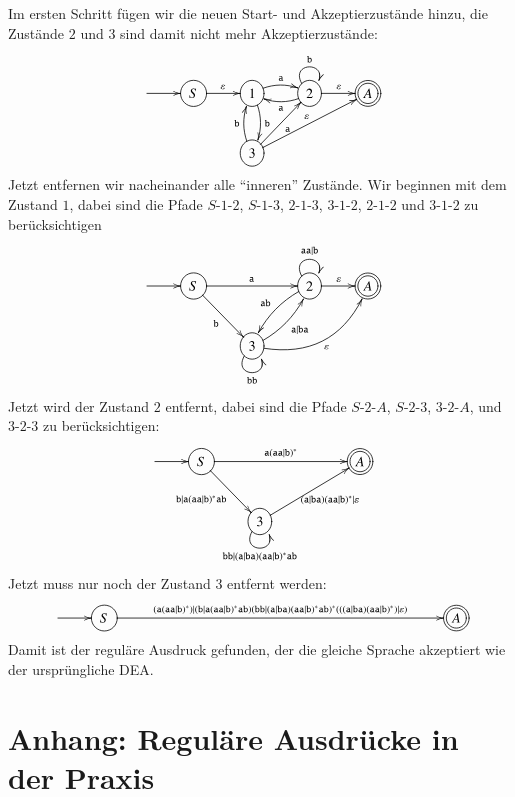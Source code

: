 Im ersten Schritt fügen wir die neuen Start- und Akzeptierzustände 
hinzu, die Zustände $2$ und $3$ sind damit nicht mehr Akzeptierzustände:
\[
\entrymodifiers={++[o][F]}
\xymatrix{
*+\txt{}\ar[r]
	&S\ar[r]^{\varepsilon}
		&{1}\ar@/^/[r]^{\tt a} \ar@/^/[d]^{\tt b}
			&{2} \ar@(ul,ur)^{\tt b} \ar@/^/[l]^{\tt a}\ar[r]^{\varepsilon}
				&*++[o][F=]{A}
\\
*+\txt{}
	&*+\txt{}
		&{3} \ar[ur]_{\tt a} \ar@/^/[u]^{\tt b} \ar[urr]^{\varepsilon}
}
\]
Jetzt entfernen wir nacheinander alle ``inneren'' Zustände.
Wir beginnen mit dem Zustand $1$, dabei sind die Pfade
$S$-$1$-$2$,
$S$-$1$-$3$,
$2$-$1$-$3$,
$3$-$1$-$2$,
$2$-$1$-$2$
und $3$-$1$-$2$
zu berücksichtigen
\[
\entrymodifiers={++[o][F]}
\xymatrix{
*+\txt{}\ar[r]
	&S\ar[rr]^{\tt a} \ar[dr]_{\tt b}
		&*+\txt{}
			&{2} \ar@(ul,ur)^{\tt aa|b} \ar@/_/[dl]_{\tt ab} \ar[r]^{\varepsilon}
				&*++[o][F=]{A}
\\
*+\txt{}
	&*+\txt{}
		&{3} \ar@/_/[ur]_{\tt a|ba} \ar@/_20pt/[urr]_{\varepsilon} \ar@(dl,dr)_{\tt bb}
}
\]
Jetzt wird der Zustand $2$ entfernt, dabei sind die Pfade 
$S$-$2$-$A$,
$S$-$2$-$3$,
$3$-$2$-$A$,
und
$3$-$2$-$3$
zu berücksichtigen:
\[
\entrymodifiers={++[o][F]}
\xymatrix{
*+\txt{}\ar[r]
	&S\ar[rrr]^{\tt a(aa|b)^*} \ar[dr]_{\tt b|a(aa|b)^*ab}
		&*+\txt{}
			&*+\txt{}
				&*++[o][F=]{A}
\\
*+\txt{}
	&*+\txt{}
		&{3} \ar[urr]_{{\tt (a|ba)(aa|b)^*}|\varepsilon} \ar@(dl,dr)_{{\tt bb|(a|ba)(aa|b)^*ab}}
}
\]
Jetzt muss nur noch der Zustand $3$ entfernt werden:
\[
\entrymodifiers={++[o][F]}
\xymatrix{
*+\txt{}\ar[r]
	&S\ar[rrrrrrrr]^{\tt (a(aa|b)^*)|(b|a(aa|b)^*ab)(bb|(a|ba)(aa|b)^*ab)^*(((a|ba)(aa|b)^*)|\varepsilon)}
		&*+\txt{}
			&*+\txt{}
			&*+\txt{}
			&*+\txt{}
			&*+\txt{}
			&*+\txt{}
			&*+\txt{}
				&*++[o][F=]{A}
}
\]
Damit ist der reguläre Ausdruck gefunden, der die gleiche Sprache
akzeptiert wie der ursprüngliche DEA.

\section{Anhang: Reguläre Ausdrücke in der Praxis\label{regulaer:praxis}}
